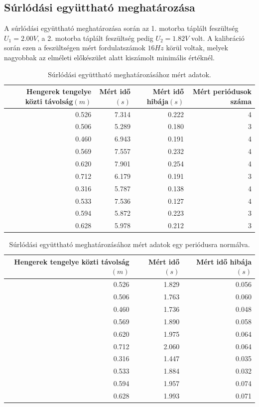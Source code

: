 \documentclass[10pt,pdftex]{report}
\begin{document}
\subsection*{Súrlódási együttható meghatározása}
A súrlódási együttható meghatározása során az 1. motorba táplált feszültség $U_1=2.00V$, a 2. motorba táplált feszültség pedig $U_2=1.82V$ volt.
A kalibráció során ezen a feszültségen mért fordulatszámok $16Hz$ körül voltak, melyek nagyobbak az elméleti előkészület alatt kiszámolt minimális értéknél. \\
\begin{table}[H]
    \begin{tabular}{|r|r|r|r|}
        \hline
        Hengerek tengelye közti távolság$(m)$ & Mért idő$(s)$ & Mért idő hibája$(s)$ & Mért periódusok száma \\
        \hline
        0.526 & 7.314 & 0.222 & 4 \\
        \hline
        0.506 & 5.289 & 0.180 & 3 \\
        \hline
        0.460 & 6.943 & 0.191 & 4 \\
        \hline
        0.569 & 7.557 & 0.232 & 4 \\
        \hline
        0.620 & 7.901 & 0.254 & 4 \\
        \hline
        0.712 & 6.179 & 0.191 & 3 \\
        \hline
        0.316 & 5.787 & 0.138 & 4 \\
        \hline
        0.533 & 7.536 & 0.127 & 4 \\
        \hline
        0.594 & 5.872 & 0.223 & 3 \\
        \hline
        0.628 & 5.978 & 0.212 & 3 \\
        \hline
    \end{tabular}
    \caption{Súrlódási együttható meghatározásához mért adatok.}
\end{table}
\begin{table}[H]
    \begin{tabular}{|r|r|r|}
        \hline
        Hengerek tengelye közti távolság$(m)$ & Mért idő$(s)$ & Mért idő hibája$(s)$ \\
        \hline
        0.526 & 1.829 & 0.056 \\
        \hline
        0.506 & 1.763 & 0.060 \\
        \hline
        0.460 & 1.736 & 0.048 \\
        \hline
        0.569 & 1.890 & 0.058 \\
        \hline
        0.620 & 1.975 & 0.064 \\
        \hline
        0.712 & 2.060 & 0.064 \\
        \hline
        0.316 & 1.447 & 0.035 \\
        \hline
        0.533 & 1.884 & 0.032 \\
        \hline
        0.594 & 1.957 & 0.074 \\
        \hline
        0.628 & 1.993 & 0.071 \\
        \hline
    \end{tabular}
    \caption{Súrlódási együttható meghatározásához mért adatok egy periódusra normálva.}
\end{table}
\end{document}
